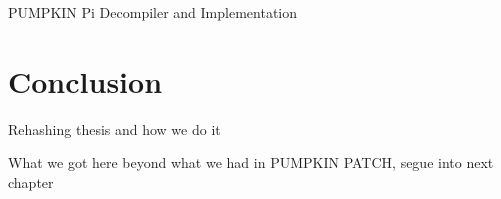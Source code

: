 PUMPKIN Pi Decompiler and Implementation



\section{Conclusion}

Rehashing thesis and how we do it

What we got here beyond what we had in PUMPKIN PATCH, segue into next chapter



%

%

%

%

%

%

%

%

%

%

%

%

%

%

%

%

%

